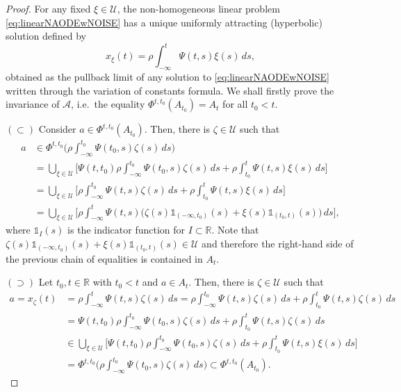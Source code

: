 \documentclass[10pt,a4paper]{amsart}
\newcommand{\A}{\mathcal{A}}
\newcommand{\R}{\mathbb{R}}
\newcommand{\U}{\mathcal{U}}
\begin{document}
\begin{proof}
     For any fixed $\xi\in\U$, the non-homogeneous linear problem \eqref{eq:linearNAODEwNOISE} has a unique uniformly attracting (hyperbolic) solution defined by 
    \[
    x_\xi(t)=\rho\int_{-\infty}^t\Psi(t,s)\xi(s)\,ds,
    \]
    obtained as the pullback limit of any solution to \eqref{eq:linearNAODEwNOISE} written through the variation of constants formula. We shall firstly prove the invariance of $\A$, i.e.~the equality $\Phi^{t,t_0}(A_{t_0})= A_t$ for all $t_0<t$.

    $(\subset)$ Consider $a\in\Phi^{t,t_0}(A_{t_0})$. Then, there is $\zeta\in\U$ such that 
    \[
    \begin{split}
    a&\in\Phi^{t,t_0}\bigg(\rho\int_{-\infty}^{t_0}\Psi(t_0,s)\zeta(s)\,ds\bigg)\\
    &=\bigcup_{\xi\in\U}\Big[\Psi(t,t_0)\rho\int_{-\infty}^{t_0}\Psi(t_0,s)\zeta(s)\,ds+\rho\int_{t_0}^t\Psi(t,s)\xi(s)\,ds\Big]\\
    &=\bigcup_{\xi\in\U}\Big[\rho\int_{-\infty}^{t_0}\Psi(t,s)\zeta(s)\,ds+\rho\int_{t_0}^t\Psi(t,s)\xi(s)\,ds\Big]\\
    &=\bigcup_{\xi\in\U}\Big[\rho\int_{-\infty}^{t}\Psi(t,s)\big(\zeta(s)\mathds{1}_{(-\infty,t_0)}(s)+\xi(s)\mathds{1}_{(t_0,t)}(s)\big)\,ds\Big],
     \end{split}
    \]
    where $\mathds{1}_I(s)$ is the indicator function for $I\subset\R$. Note that $\zeta(s)\mathds{1}_{(-\infty,t_0)}(s)+\xi(s)\mathds{1}_{(t_0,t)}(s)\in\U$ and therefore the right-hand side of the previous chain of equalities is contained in $ A_t$.

    $(\supset)$ Let $t_0,t\in\R$ with $t_0<t$ and $a\in  A_t$. Then, there is $\zeta\in\U$ such that 
    \[
    \begin{split}
    a= x_\zeta(t)&=\rho\int_{-\infty}^{t}\Psi(t,s)\zeta(s)\,ds=\rho\int_{-\infty}^{t_0}\Psi(t,s)\zeta(s)\,ds+\rho\int_{t_0}^{t}\Psi(t,s)\zeta(s)\,ds\\
    &=\Psi(t,t_0)\rho\int_{-\infty}^{t_0}\Psi(t_0,s)\zeta(s)\,ds+\rho\int_{t_0}^t\Psi(t,s)\zeta(s)\,ds\\
    &\in \bigcup_{\xi\in\U}\Big[\Psi(t,t_0)\rho\int_{-\infty}^{t_0}\Psi(t_0,s)\zeta(s)\,ds+\rho\int_{t_0}^t\Psi(t,s)\xi(s)\,ds\Big]\\
    &=\Phi^{t,t_0}\bigg(\rho\int_{-\infty}^{t_0}\Psi(t_0,s)\zeta(s)\,ds\bigg)\subset\Phi^{t,t_0}(A_{t_0}).
    \end{split}
    \]


\end{proof}
\end{document}
